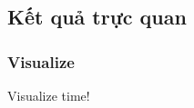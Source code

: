 \documentclass{beamer}
\begin{document}
    \subsection{Kết quả trực quan}
    \begin{frame}
    	\frametitle{Visualize}
    	Visualize time!
    \end{frame}

    \QApage
\end{document}
